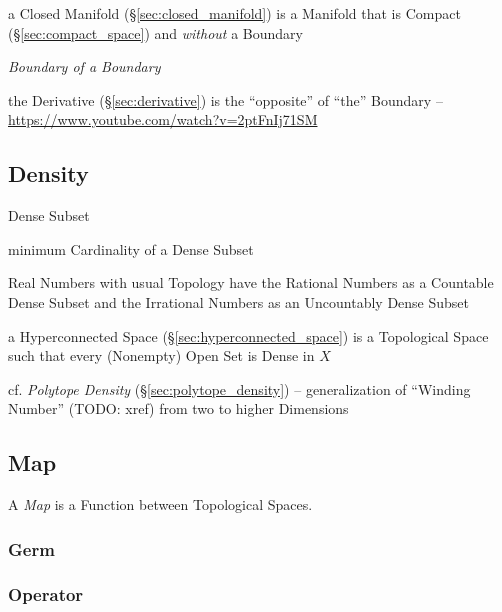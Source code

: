 \fist a Closed Manifold (\S\ref{sec:closed_manifold}) is a Manifold that is
Compact (\S\ref{sec:compact_space}) and \emph{without} a Boundary

\emph{Boundary of a Boundary}

\fist the Derivative (\S\ref{sec:derivative}) is the ``opposite'' of ``the''
Boundary --\url{https://www.youtube.com/watch?v=2ptFnIj71SM}



\subsection{Density}\label{sec:density}

Dense Subset

minimum Cardinality of a Dense Subset

Real Numbers with usual Topology have the Rational Numbers as a Countable Dense
Subset and the Irrational Numbers as an Uncountably Dense Subset

\fist a Hyperconnected Space (\S\ref{sec:hyperconnected_space}) is a
Topological Space such that every (Nonempty) Open Set is Dense in $X$

\fist cf. \emph{Polytope Density} (\S\ref{sec:polytope_density}) --
generalization of ``Winding Number'' (TODO: xref) from two to higher Dimensions



\subsection{Map}\label{sec:topology_map}

A \emph{Map} is a Function between Topological Spaces.



\subsubsection{Germ}\label{sec:germ}

\subsubsection{Operator}\label{sec:space_operator}

